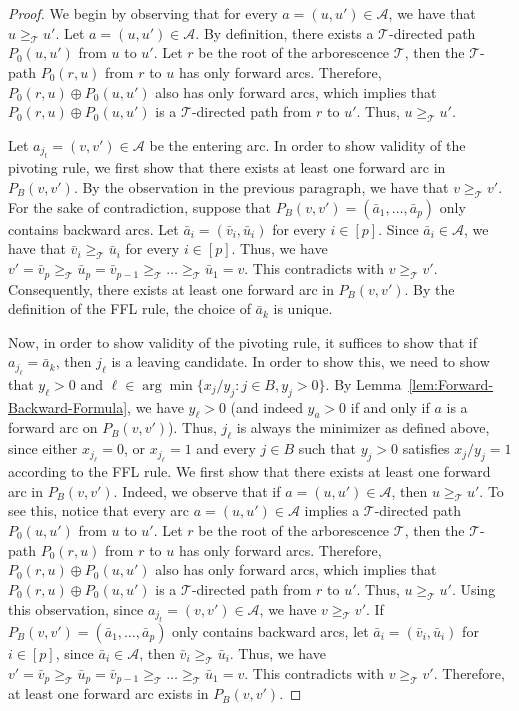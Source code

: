 \documentclass[11pt]{article}
\begin{document}
\begin{proof}
We begin by observing that for every $a=(u,u')\in\mathcal{A}$, we have that $u\ge_{\mathcal{T}}u'$. Let $a=(u, u')\in \mathcal{A}$. By definition, there exists a $\mathcal{T}$-directed path $P_0(u,u')$ from $u$ to $u'$. Let $r$ be the root of the arborescence $\mathcal{T}$, then the $\mathcal{T}$-path $P_0(r,u)$ from $r$ to $u$ has only forward arcs. Therefore, $P_0(r,u)\oplus P_0(u,u')$ also has only forward arcs, which implies that $P_0(r,u)\oplus P_0(u,u')$ is a $\mathcal{T}$-directed path from $r$ to $u'$. Thus, $u\ge_{\mathcal{T}} u'$. 

 Let $a_{j_t}=(v,v')\in\mathcal{A}$ be the entering arc. 
In order to show validity of the pivoting rule, we first show that there exists at least one forward arc in $P_B(v,v')$. By the observation in the previous paragraph, we have that $v\ge_\mathcal{T}v'$. For the sake of contradiction, suppose that $P_B(v,v')=(\bar{a}_1,\dots,\bar{a}_p)$ only contains backward arcs. Let $\bar{a}_i=(\bar{v}_i,\bar{u}_i)$ for every $i\in[p]$. 
Since $\bar{a}_i\in\mathcal{A}$, we have that $\bar{v}_i\ge_{\mathcal{T}}\bar{u}_i$ for every $i\in [p]$. Thus, we have $v'=\bar{v}_p\ge_{\mathcal{T}}\bar{u}_p=\bar{v}_{p-1}\ge_{\mathcal{T}}\dots\ge_{\mathcal{T}}\bar{u}_1=v$. This contradicts with $v\ge_{\mathcal{T}} v'$. Consequently, there exists at least one forward arc in $P_B(v,v')$. By the definition of the FFL rule, the choice of $\bar{a}_k$ is unique. 

Now, in order to show validity of the pivoting rule, it suffices to show that if $a_{j_\ell}=\bar{a}_k$, then $j_\ell$ is a leaving candidate. In order to show this, we need to show that $y_{\ell}>0$ and $\ell\in\arg\min\{x_j/y_j:j\in B,y_j>0\}$. By Lemma~\ref{lem:Forward-Backward-Formula}, we have $y_{\ell}>0$ (and indeed $y_a>0$ if and only if $a$ is a forward arc on $P_B(v,v')$). Thus, $j_\ell$ is always the minimizer as defined above, since either $x_{j_\ell}=0$, or $x_{j_\ell}=1$ and every $j\in B$ such that $y_j>0$ satisfies $x_j/y_j=1$ according to the FFL rule.
\iffalse
We first show that 
    there exists at least one forward arc in $P_B(v,v')$. Indeed, we observe that if  $a=(u,u')\in\mathcal{A}$, then $u\ge_{\mathcal{T}}u'$. To see this, notice that every arc $a=(u,u')\in\mathcal{A}$ implies a $\mathcal{T}$-directed path $P_0(u,u')$ from $u$ to $u'$. Let $r$ be the root of the arborescence $\mathcal{T}$, then the $\mathcal{T}$-path $P_0(r,u)$ from $r$ to $u$ has only forward arcs. Therefore, $P_0(r,u)\oplus P_0(u,u')$ also has only forward arcs, which implies that $P_0(r,u)\oplus P_0(u,u')$ is a $\mathcal{T}$-directed path from $r$ to $u'$. Thus, $u\ge_{\mathcal{T}} u'$. Using this observation, since $a_{j_t}=(v,v')\in\mathcal{A}$, we have $v\ge_\mathcal{T}v'$. If $P_B(v,v')=(\bar{a}_1,\dots,\bar{a}_p)$ only contains backward arcs, let $\bar{a}_i=(\bar{v}_i,\bar{u}_i)$ for $i\in[p]$, since $\bar{a}_i\in\mathcal{A}$, then $\bar{v}_i\ge_{\mathcal{T}}\bar{u}_i$. Thus, we have $v'=\bar{v}_p\ge_{\mathcal{T}}\bar{u}_p=\bar{v}_{p-1}\ge_{\mathcal{T}}\dots\ge_{\mathcal{T}}\bar{u}_1=v$. This contradicts with $v\ge_{\mathcal{T}} v'$. Therefore, at least one forward arc exists in $P_B(v,v')$.



\end{proof}
\end{document}

